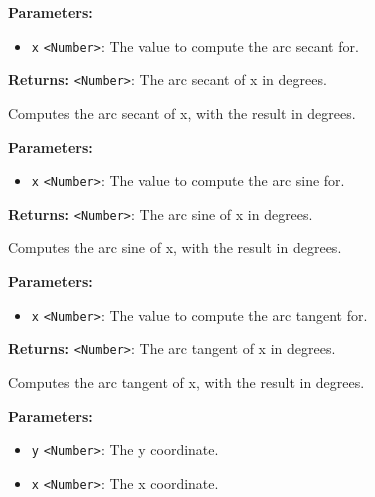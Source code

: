 \documentclass[12pt,a4paper]{article}
\begin{document}
\noindent \textbf{Parameters:}
\begin{itemize}
  \item \texttt{x} \texttt{<Number>}: The value to compute the arc secant for.
\end{itemize}

\noindent \textbf{Returns:} \texttt{<Number>}: The arc secant of x in degrees.

\noindent Computes the arc secant of x, with the result in degrees.

\vspace{5mm}
\noindent {}


\noindent \textbf{Parameters:}
\begin{itemize}
  \item \texttt{x} \texttt{<Number>}: The value to compute the arc sine for.
\end{itemize}

\noindent \textbf{Returns:} \texttt{<Number>}: The arc sine of x in degrees.

\noindent Computes the arc sine of x, with the result in degrees.

\vspace{5mm}
\noindent {}


\noindent \textbf{Parameters:}
\begin{itemize}
  \item \texttt{x} \texttt{<Number>}: The value to compute the arc tangent for.
\end{itemize}

\noindent \textbf{Returns:} \texttt{<Number>}: The arc tangent of x in degrees.

\noindent Computes the arc tangent of x, with the result in degrees.

\vspace{5mm}
\noindent {}


\noindent \textbf{Parameters:}
\begin{itemize}
  \item \texttt{y} \texttt{<Number>}: The y coordinate.
  \item \texttt{x} \texttt{<Number>}: The x coordinate.
\end{itemize}
\end{document}
